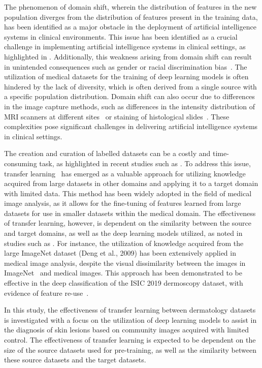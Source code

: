 The phenomenon of domain shift, wherein the distribution of features in the new population diverges from the distribution of features present in the training data, has been identified as a major obstacle in the deployment of artificial intelligence systems in clinical environments. This issue has been identified as a crucial challenge in implementing artificial intelligence systems in clinical settings, as highlighted in \cite{kelly2019key}. Additionally, this weakness arising from domain shift can result in unintended consequences such as gender or racial discrimination bias~\citep{glocker2022risk}. The utilization of medical datasets for the training of deep learning models is often hindered by the lack of diversity, which is often derived from a single source with a specific population distribution. Domain shift can also occur due to differences in the image capture methods, such as differences in the intensity distribution of MRI scanners at different sites~\citep{prados2017spinal} or staining of histological slides~\citep{stacke2020measuring}. These complexities pose significant challenges in delivering artificial intelligence systems in clinical settings.

The creation and curation of labelled datasets can be a costly and time-consuming task, as highlighted in recent studies such as \cite{chin2022prepare}. To address this issue, transfer learning~\citep{srinidhi2020deep} has emerged as a valuable approach for utilizing knowledge acquired from large datasets in other domains and applying it to a target domain with limited data. This method has been widely adopted in the field of medical image analysis, as it allows for the fine-tuning of features learned from large datasets for use in smaller datasets within the medical domain. The effectiveness of transfer learning, however, is dependent on the similarity between the source and target domains, as well as the deep learning models utilized, as noted in studies such as \cite{matsoukas2022makes}. For instance, the utilization of knowledge acquired from the large ImageNet dataset (Deng et al., 2009) has been extensively applied in medical image analysis, despite the visual dissimilarity between the images in ImageNet~\citep{deng2009imagenet} and medical images. This approach has been demonstrated to be effective in the deep classification of the ISIC 2019 dermoscopy dataset, with evidence of feature re-use~\citep{matsoukas2022makes}.

In this study, the effectiveness of transfer learning between dermatology datasets is investigated with a focus on the utilization of deep learning models to assist in the diagnosis of skin lesions based on community images acquired with limited control. The effectiveness of transfer learning is expected to be dependent on the size of the source datasets used for pre-training, as well as the similarity between these source datasets and the target datasets.

